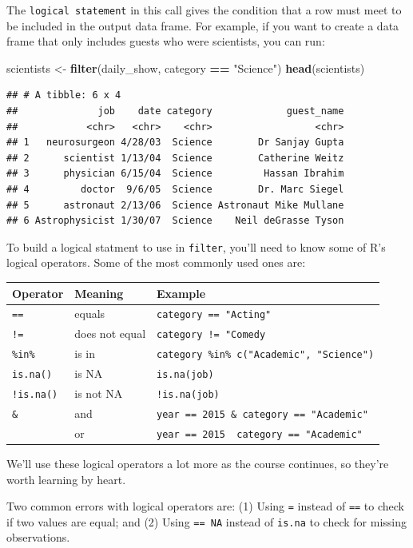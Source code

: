 \documentclass[]{book}
\makeatletter
\newenvironment{Shaded}{\begin{snugshade}}{\end{snugshade}}
\newcommand{\KeywordTok}[1]{\textcolor[rgb]{0.13,0.29,0.53}{\textbf{#1}}}
\newcommand{\StringTok}[1]{\textcolor[rgb]{0.31,0.60,0.02}{#1}}
\newcommand{\OperatorTok}[1]{\textcolor[rgb]{0.81,0.36,0.00}{\textbf{#1}}}
\newcommand{\NormalTok}[1]{#1}
\newenvironment{kframe}{%
\medskip{}
\setlength{\fboxsep}{.8em}
 \def\at@end@of@kframe{}%
 \ifinner\ifhmode%
  \def\at@end@of@kframe{\end{minipage}}%
  \begin{minipage}{\columnwidth}%
 \fi\fi%
 \def\FrameCommand##1{\hskip\@totalleftmargin \hskip-\fboxsep
 \colorbox{shadecolor}{##1}\hskip-\fboxsep
     \hskip-\linewidth \hskip-\@totalleftmargin \hskip\columnwidth}%
 \MakeFramed {\advance\hsize-\width
   \@totalleftmargin\z@ \linewidth\hsize
   \@setminipage}}%
 {\par\unskip\endMakeFramed%
 \at@end@of@kframe}
\renewenvironment{Shaded}{\begin{kframe}}{\end{kframe}}
\newenvironment{rmdblock}[1]
  {
  \begin{itemize}
  \renewcommand{\labelitemi}{
    \raisebox{-.7\height}[0pt][0pt]{
      {\setkeys{Gin}{width=3em,keepaspectratio}\texttt{[image: images/\#1]}}
    }
  }
  \setlength{\fboxsep}{1em}
  \begin{kframe}
  \item
  }
  {
  \end{kframe}
  \end{itemize}
  }
\newenvironment{rmdwarning}
  {\begin{rmdblock}{warning}}
  {\end{rmdblock}}
\theoremstyle{definition}
\theoremstyle{definition}
\theoremstyle{definition}
\theoremstyle{remark}
\makeatother
\begin{document}
The \texttt{logical\ statement} in this call gives the condition that a
row must meet to be included in the output data frame. For example, if
you want to create a data frame that only includes guests who were
scientists, you can run:

\begin{Shaded}
\begin{Highlighting}[]
\NormalTok{scientists <-}\StringTok{ }\KeywordTok{filter}\NormalTok{(daily_show, category }\OperatorTok{==}\StringTok{ "Science"}\NormalTok{)}
\KeywordTok{head}\NormalTok{(scientists)}
\end{Highlighting}
\end{Shaded}

\begin{verbatim}
## # A tibble: 6 x 4
##              job    date category             guest_name
##            <chr>   <chr>    <chr>                  <chr>
## 1   neurosurgeon 4/28/03  Science        Dr Sanjay Gupta
## 2      scientist 1/13/04  Science        Catherine Weitz
## 3      physician 6/15/04  Science         Hassan Ibrahim
## 4         doctor  9/6/05  Science        Dr. Marc Siegel
## 5      astronaut 2/13/06  Science Astronaut Mike Mullane
## 6 Astrophysicist 1/30/07  Science    Neil deGrasse Tyson
\end{verbatim}

To build a logical statment to use in \texttt{filter}, you'll need to
know some of R's logical operators. Some of the most commonly used ones
are:

\begin{longtable}[]{@{}lll@{}}
\toprule
Operator & Meaning & Example\tabularnewline
\midrule
\endhead
\texttt{==} & equals & \texttt{category\ ==\ "Acting"}\tabularnewline
\texttt{!=} & does not equal &
\texttt{category\ !=\ "Comedy}\tabularnewline
\texttt{\%in\%} & is in &
\texttt{category\ \%in\%\ c("Academic",\ "Science")}\tabularnewline
\texttt{is.na()} & is NA & \texttt{is.na(job)}\tabularnewline
\texttt{!is.na()} & is not NA & \texttt{!is.na(job)}\tabularnewline
\texttt{\&} & and &
\texttt{year\ ==\ 2015\ \&\ category\ ==\ "Academic"}\tabularnewline
\texttt{\textbar{}} & or &
\texttt{year\ ==\ 2015\ \textbar{}\ category\ ==\ "Academic"}\tabularnewline
\bottomrule
\end{longtable}

We'll use these logical operators a lot more as the course continues, so
they're worth learning by heart.

\begin{rmdwarning}
Two common errors with logical operators are: (1) Using \texttt{=}
instead of \texttt{==} to check if two values are equal; and (2) Using
\texttt{==\ NA} instead of \texttt{is.na} to check for missing
observations.
\end{rmdwarning}
\end{document}
